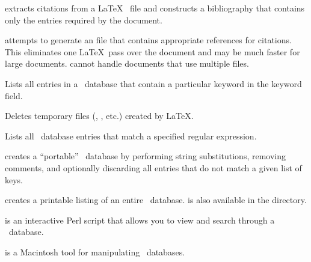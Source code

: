 
 extracts citations from a \LaTeX\  file and
constructs a bibliography that contains only the entries required by
the document.


 attempts to generate an  file that contains
appropriate references for citations.  This eliminates one \LaTeX\
pass over the document and may be much faster for large documents.
\program{bibify} cannot handle documents that use multiple 
files.


Lists all entries in a \BibTeX\ database that contain
a particular keyword in the keyword field.


Deletes temporary files (, , etc.) created by \LaTeX.

\newpage
{}

Lists all \BibTeX\ database entries that match a specified regular
expression.


 creates a ``portable'' \BibTeX\ database by performing
string substitutions, removing comments, and optionally discarding all
entries that do not match a given list of keys.


 creates a printable listing of an entire \BibTeX\ database.
\program{printbib} is also available in the
 directory.


 is an interactive Perl script that allows you to view
and search through a \BibTeX\ database.


 is a Macintosh tool for manipulating \BibTeX\ databases.


